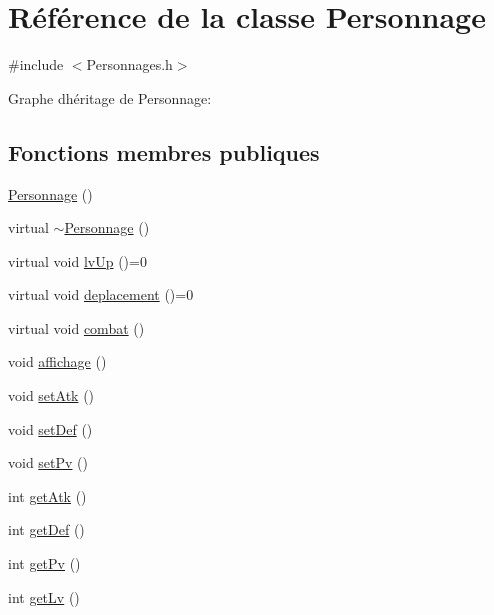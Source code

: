 \hypertarget{classPersonnage}{}\section{Référence de la classe Personnage}
\label{classPersonnage}


{\ttfamily \#include $<$Personnages.\+h$>$}



Graphe d\textquotesingle{}héritage de Personnage\+:
\subsection*{Fonctions membres publiques}
\begin{DoxyCompactItemize}
\item 
\hyperlink{classPersonnage_abec36eb0310adc71f3375297fc590c65}{Personnage} ()
\item 
virtual \hyperlink{classPersonnage_ac2d42c52a39502e915c82081a7c056f6}{$\sim$\+Personnage} ()
\item 
virtual void \hyperlink{classPersonnage_acdbb926ead0cf6f0b919e72148b02f6d}{lv\+Up} ()=0
\item 
virtual void \hyperlink{classPersonnage_afb4a375fa5494eb586b9470d72a46694}{deplacement} ()=0
\item 
virtual void \hyperlink{classPersonnage_a42306b5ce866d7e243988f7c74a0e863}{combat} ()
\item 
void \hyperlink{classPersonnage_a4c09f145cfa8e318d7c9521cf70dc82c}{affichage} ()
\item 
void \hyperlink{classPersonnage_a98c99ab54a98b935a86bb13b52c2e0bd}{set\+Atk} ()
\item 
void \hyperlink{classPersonnage_ad59d8bc68772a6d133e4cabf9486a4a9}{set\+Def} ()
\item 
void \hyperlink{classPersonnage_ab6a055c4cc927e63fbf93c3445c83c15}{set\+Pv} ()
\item 
int \hyperlink{classPersonnage_a929fa50e52b375c40455191d0d7f3fc9}{get\+Atk} ()
\item 
int \hyperlink{classPersonnage_a2f3768b98bc5f21a5559c74826e4df16}{get\+Def} ()
\item 
int \hyperlink{classPersonnage_acfa390cc94bead3b08b00a55f016d2c3}{get\+Pv} ()
\item 
int \hyperlink{classPersonnage_af1534fd0d8549231464d4876f977d6b4}{get\+Lv} ()
\end{DoxyCompactItemize}
